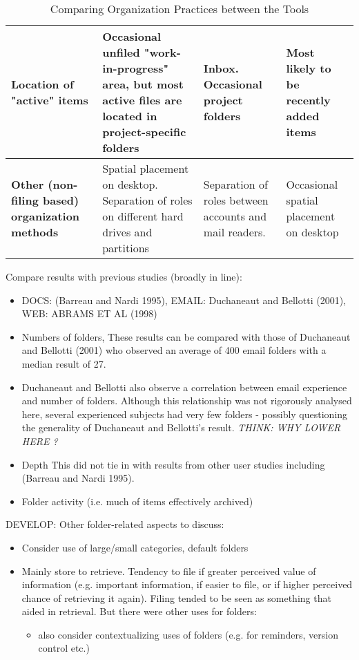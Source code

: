 \begin{table}[h]
\begin{center}
\begin{footnotesize}
\begin{tabular}{|p{2.5cm}|p{3.5cm}|p{3.5cm}|p{3.5cm}|}
\hline
{\bf Location of "active" items} & Occasional unfiled "work-in-progress" area, but most active files are located in project-specific folders & Inbox. Occasional project folders & Most likely to be recently added items \\
\hline
{\bf Other (non-filing based)  organization methods} & Spatial placement on desktop. Separation of roles on different hard drives and partitions & Separation of roles between accounts and mail readers. & Occasional spatial placement on desktop \\
\hline
\end{tabular}  
\end{footnotesize}
\caption{Comparing Organization Practices between the Tools}
\label{table:chapter3_organization_strategy}
\end{center}
\end{table}


\noindent
Compare results with previous studies (broadly in line):
\begin{itemize}
	\item DOCS: (Barreau and Nardi 1995), EMAIL: Duchaneaut and Bellotti (2001), WEB: ABRAMS ET AL (1998)
	\item Numbers of folders, These results can be compared with those of Duchaneaut and Bellotti (2001) who observed an average of 400 email folders with a median result of 27.
	\item Duchaneaut and Bellotti also observe a correlation between email experience and number of folders. Although this relationship was not rigorously analysed here, several experienced subjects had very few folders - possibly questioning the generality of Duchaneaut and Bellotti's result. \textit{THINK: WHY LOWER HERE ?}
	\item Depth This did not tie in with results from other user studies including (Barreau and Nardi 1995). 
	\item Folder activity (i.e. much of items effectively archived)
\end{itemize}

\noindent
DEVELOP: Other folder-related aspects to discuss:
\begin{itemize}

	\item Consider use of large/small categories, default folders

	\item Mainly store to retrieve. Tendency to file if greater perceived value of information (e.g. important information, if easier to file, or if higher perceived chance of retrieving it again).  Filing tended to be seen as something that aided in retrieval. But there were other uses for folders:
	\begin{itemize}
		\item also consider contextualizing uses of folders (e.g. for reminders, version control etc.)
	\end{itemize}

\end{itemize}

